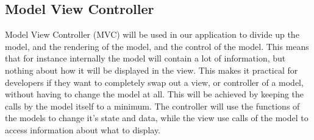 \subsection{Model View Controller}
Model View Controller (MVC) will be used in our application to divide up the model, and the rendering of the model, and the control of the model. This means that for instance internally the model will contain a lot of information, but nothing about how it will be displayed in the view. This makes it practical for developers if they want to completely swap out a view, or controller of a model, without having to change the model at all. This will be achieved by keeping the calls by the model itself to a minimum. The controller will use the functions of the models to change it's state and data, while the view use calls of the model to access information about what to display.
